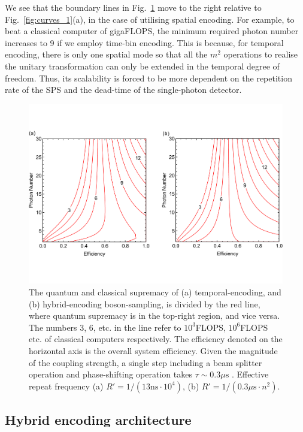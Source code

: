 \documentclass[aps,rmp,twocolumn,amsmath,amssymb,nofootinbib,superscriptaddress]{revtex4}
\begin{document}
We see that the boundary lines in Fig.~\ref{fig:curves_2} move to the right relative to Fig.~\ref{fig:curves_1}(a), in the case of utilising spatial encoding. For example, to beat a classical computer of gigaFLOPS, the minimum required photon number increases to 9 if we employ time-bin encoding. This is because, for temporal encoding, there is only one spatial mode so that all the $m^2$ operations to realise the unitary transformation can only be extended in the temporal degree of freedom. Thus, its scalability is forced to be more dependent on the repetition rate of the SPS and the dead-time of the single-photon detector.

\begin{figure}[!htb]
\includegraphics[width=\columnwidth]{curves_2}
\caption{The quantum and classical supremacy of (a) temporal-encoding, and (b) hybrid-encoding boson-sampling, is divided by the red line, where quantum supremacy is in the top-right region, and vice versa. The numbers 3, 6, etc. in the line refer to $10^3$FLOPS, $10^6$FLOPS etc. of classical computers respectively. The efficiency denoted on the horizontal axis is the overall system efficiency. Given the magnitude of the coupling strength, a single step including a beam splitter operation and phase-shifting operation takes \mbox{$\tau\sim0.3\mu\mathrm{s}$} \cite{bib:20}. Effective repeat frequency (a) \mbox{$R'=1/(13\mathrm{ns}\cdot 10^4)$}, (b) \mbox{$R'=1/(0.3\mu\mathrm{s}\cdot n^2).$}} \label{fig:curves_2}
\end{figure}

\subsection{Hybrid encoding architecture}
\end{document}
